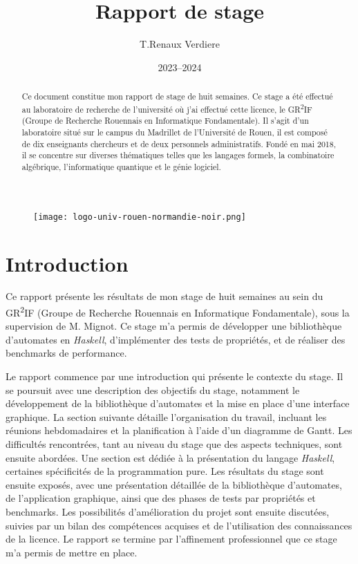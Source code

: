 \documentclass[12pt]{article}
\title{Rapport de stage}
\author{T.Renaux Verdiere}
\date{2023--2024}
\begin{document}
\begin{figure}
    \texttt{[image: logo-univ-rouen-normandie-noir.png]}
\end{figure}

\maketitle

\begin{abstract}
    Ce document constitue mon rapport de stage de huit semaines. Ce stage a été
    effectué au laboratoire de recherche de l'université où j'ai effectué cette  
    licence, le GR\textsuperscript{2}IF (Groupe de Recherche Rouennais en 
    Informatique Fondamentale). Il s'agit d'un laboratoire situé sur le campus 
    du Madrillet de l'Université de Rouen, il est composé de dix enseignants 
    chercheurs et de deux personnels administratifs. Fondé en mai 2018, il se 
    concentre sur diverses thématiques telles que les langages formels, la 
    combinatoire algébrique, l'informatique quantique et le génie logiciel.
\end{abstract}

\newpage   

\tableofcontents

\newpage

\section{Introduction}

Ce rapport présente les résultats de mon stage de huit semaines au sein du 
GR\textsuperscript{2}IF (Groupe de Recherche Rouennais en Informatique 
Fondamentale), sous la supervision de M. Mignot. Ce stage m'a permis de 
développer une bibliothèque d'automates en \textit{Haskell}, d'implémenter des 
tests de propriétés, et de réaliser des benchmarks de performance.

Le rapport commence par une introduction qui présente le contexte du stage. Il 
se poursuit avec une description des objectifs du stage, notamment le 
développement de la bibliothèque d'automates et la mise en place d'une interface 
graphique. La section suivante détaille l'organisation du travail, incluant les 
réunions hebdomadaires et la planification à l'aide d'un diagramme de Gantt. Les 
difficultés rencontrées, tant au niveau du stage que des aspects techniques, 
sont ensuite abordées. Une section est dédiée à la présentation du langage 
\textit{Haskell}, certaines spécificités de la programmation pure. Les résultats
du stage sont ensuite exposés, avec une présentation détaillée de la 
bibliothèque d'automates, de l'application graphique, ainsi que des phases de 
tests par propriétés et benchmarks. Les possibilités d'amélioration du projet 
sont ensuite discutées, suivies par un bilan des compétences acquises et de 
l'utilisation des connaissances de la licence. Le rapport se termine par 
l'affinement professionnel que ce stage m'a permis de mettre en place.









\newpage

\printbibliography
\end{document}
